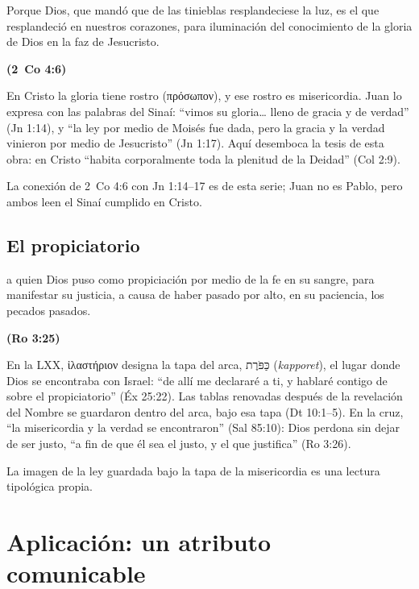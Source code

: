 \documentclass[11pt,letterpaper]{article}
\newcommand{\heb}[1]{\mbox{\foreignlanguage{hebrew}{#1}}}
\newcommand{\grc}[1]{\foreignlanguage{ancientgreek}{#1}}
\newcommand{\fuente}[1]{\par\hfill{\upshape\bfseries\small\textcolor{azul}{#1}}}
\begin{document}
\begin{cita}Porque Dios, que mandó que de las tinieblas resplandeciese la luz, es el que resplandeció en nuestros corazones, para iluminación del conocimiento de la gloria de Dios en la faz de Jesucristo.\fuente{(2~Co 4:6)}\end{cita}

En Cristo la gloria tiene rostro (\grc{πρόσωπον}), y ese rostro es misericordia. Juan lo expresa con las palabras del Sinaí: ``vimos su gloria\ldots{} lleno de gracia y de verdad'' (Jn 1:14), y ``la ley por medio de Moisés fue dada, pero la gracia y la verdad vinieron por medio de Jesucristo'' (Jn 1:17). Aquí desemboca la tesis de esta obra: en Cristo ``habita corporalmente toda la plenitud de la Deidad'' (Col 2:9).

\begin{nota}[Precisión]
La conexión de 2~Co 4:6 con Jn 1:14--17 es de esta serie; Juan no es Pablo, pero ambos leen el Sinaí cumplido en Cristo.
\end{nota}

\subsection{El propiciatorio}
\begin{cita}a quien Dios puso como propiciación por medio de la fe en su sangre, para manifestar su justicia, a causa de haber pasado por alto, en su paciencia, los pecados pasados.\fuente{(Ro 3:25)}\end{cita}

En la LXX, \grc{ἱλαστήριον} designa la tapa del arca, \heb{כַּפֹּרֶת} (\emph{kapporet}), el lugar donde Dios se encontraba con Israel: ``de allí me declararé a ti, y hablaré contigo de sobre el propiciatorio'' (Éx 25:22). Las tablas renovadas después de la revelación del Nombre se guardaron dentro del arca, bajo esa tapa (Dt 10:1--5). En la cruz, ``la misericordia y la verdad se encontraron'' (Sal 85:10): Dios perdona sin dejar de ser justo, ``a fin de que él sea el justo, y el que justifica'' (Ro 3:26).

\begin{nota}[Precisión]
La imagen de la ley guardada bajo la tapa de la misericordia es una lectura tipológica propia.
\end{nota}

\section{Aplicación: un atributo comunicable}
\end{document}

